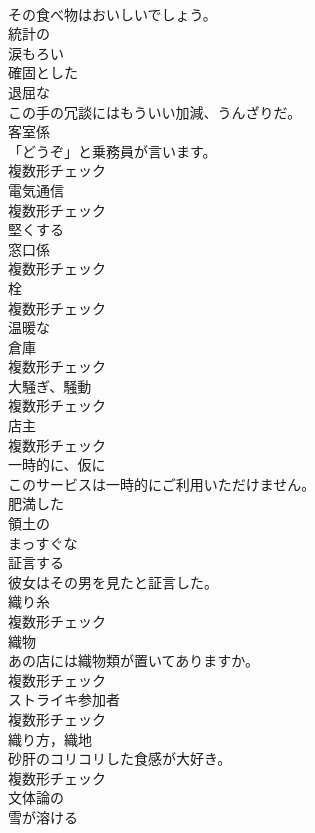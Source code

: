\documentclass[8pt]{extreport}
\begin{document}
\begin{CJK}{UTF8}{min}
\\	その食べ物はおいしいでしょう。	
\\	[形容詞]	統計の	
\\	[形容詞]	涙もろい	
\\	[形容詞]	確固とした	
\\	[形容詞]	退屈な	
\\	この手の冗談にはもういい加減、うんざりだ。	
\\	[名詞]	客室係	
\\	「どうぞ」と乗務員が言います。	
\\	複数形チェック
\\	[名詞]	電気通信	
\\	複数形チェック
\\	[動詞]	堅くする	
\\	[名詞]	窓口係	
\\	複数形チェック
\\	[名詞]	栓	
\\	複数形チェック
\\	[形容詞]	温暖な	
\\	[名詞]	倉庫	
\\	複数形チェック
\\	[名詞]	大騒ぎ、騒動	
\\	複数形チェック
\\	[名詞]	店主	
\\	複数形チェック
\\	[副詞]	一時的に、仮に	
\\	このサービスは一時的にご利用いただけません。	
\\	[形容詞]	肥満した	
\\	[形容詞]	領土の	
\\	[形容詞]	まっすぐな	
\\	[動詞]	証言する	
\\	彼女はその男を見たと証言した。	
\\	[名詞]	織り糸	
\\	複数形チェック
\\	[名詞]	織物	
\\	あの店には織物類が置いてありますか。	
\\	複数形チェック
\\	[名詞]	ストライキ参加者	
\\	複数形チェック
\\	[名詞]	織り方，織地	
\\	砂肝のコリコリした食感が大好き。	
\\	複数形チェック
\\	[形容詞]	文体論の	
\\	[動詞]	雪が溶ける	

\end{CJK}
\end{document}
